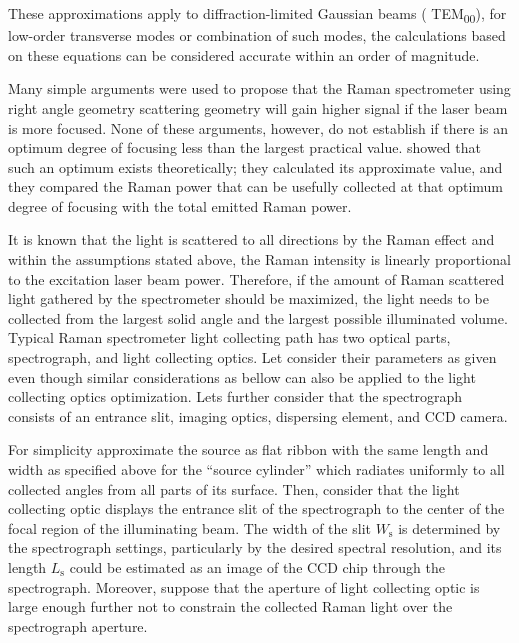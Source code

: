 These approximations apply to diffraction-limited Gaussian beams (
TEM\textsubscript{00}), for low-order transverse modes or combination of such
modes, the calculations based on these equations can be considered accurate
within an order of magnitude.

Many simple arguments \parencite{Atwood1963,Barrett1968} were used to propose
that the Raman spectrometer using right angle geometry scattering geometry
will gain higher signal if the laser beam is more focused. None of these
arguments, however, do not establish if there is an optimum degree of
focusing less than the largest practical value. \textcite{Barrett1968} showed
that such an optimum exists theoretically; they calculated its approximate
value, and they compared the Raman power that can be usefully collected at
that optimum degree of focusing with the total emitted Raman power.

It is known that the light is scattered to all directions by the Raman effect
and within the assumptions stated above, the Raman intensity is linearly
proportional to the excitation laser beam power. Therefore, if the amount of
Raman scattered light gathered by the spectrometer should be maximized, the
light needs to be collected from the largest solid angle and the largest
possible illuminated volume. Typical Raman spectrometer light collecting path
has two optical parts, spectrograph, and light collecting optics. Let
consider their parameters as given even though similar considerations as
bellow can also be applied to the light collecting optics optimization. Lets
further consider that the spectrograph consists of an entrance slit, imaging
optics, dispersing element, and CCD camera.

For simplicity approximate the source as flat ribbon with the same length and
width as specified above for the “source cylinder” which radiates uniformly
to all collected angles from all parts of its surface. Then, consider that
the light collecting optic displays the entrance slit of the spectrograph to
the center of the focal region of the illuminating beam. The width of the
slit $W_\mathrm{s}$ is determined by the spectrograph settings, particularly
by the desired spectral resolution, and its length $L_\mathrm{s}$ could be
estimated as an image of the CCD chip through the spectrograph. Moreover,
suppose that the aperture of light collecting optic is large enough further
not to constrain the collected Raman light over the spectrograph aperture.

